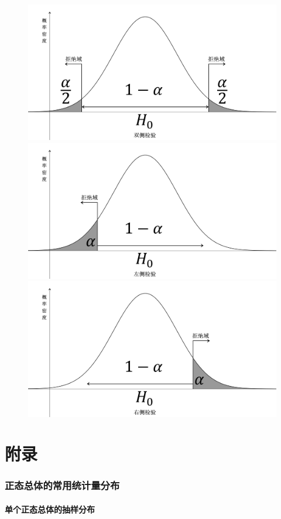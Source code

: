 \documentclass{article}
\begin{document}
\begin{figure}[H]
    \centering
    \includegraphics[width=0.6\linewidth]{BilateralTesting.png}
    \includegraphics[width=0.6\linewidth]{LeftSideTest.png}
    \includegraphics[width=0.6\linewidth]{RightSideTest.png}
\end{figure}

\newpage

\appendix

\part{附录}

\section{正态总体的常用统计量分布}

\subsection{单个正态总体的抽样分布}
\end{document}
